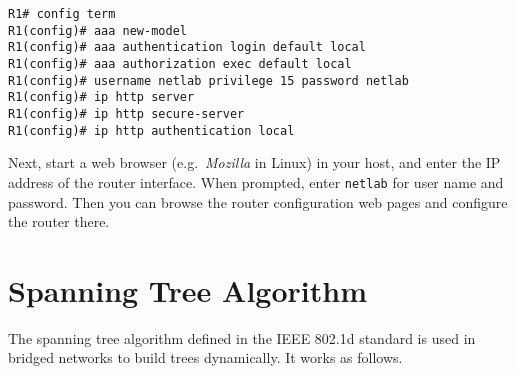 \documentclass{../UTNetLab}
\begin{document}
    \begin{lstlisting}[language={cisco},emph={netlab}]
R1# config term
R1(config)# aaa new-model
R1(config)# aaa authentication login default local
R1(config)# aaa authorization exec default local
R1(config)# username netlab privilege 15 password netlab
R1(config)# ip http server
R1(config)# ip http secure-server
R1(config)# ip http authentication local
    \end{lstlisting}
    
    Next, start a web browser (e.g.\ \textit{Mozilla} in Linux) in your host, and enter the IP address of the router interface.
    When prompted, enter \texttt{netlab} for user name and password.
    Then you can browse the router configuration web pages and configure the router there.


\newpage
\appendix

\section{Spanning Tree Algorithm}
\label{appendix:spanningTree}
    The spanning tree algorithm defined in the IEEE 802.1d standard is used in bridged networks to build trees dynamically.
    It works as follows.
\end{document}
